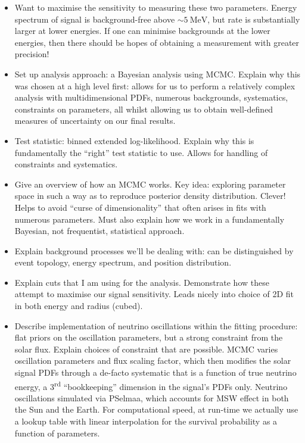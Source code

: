      \begin{itemize}
        \item Want to maximise the sensitivity to measuring these two parameters. Energy spectrum of signal is background-free above $\sim\SI{5}{\MeV}$, but rate is substantially larger at lower energies. If one can minimise backgrounds at the lower energies, then there should be hopes of obtaining a measurement with greater precision!
        \item Set up analysis approach: a Bayesian analysis using MCMC. Explain why this was chosen at a high level first: allows for us to perform a relatively complex analysis with multidimensional PDFs, numerous backgrounds, systematics, constraints on parameters, all whilst allowing us to obtain well-defined measures of uncertainty on our final results.
        \item Test statistic: binned extended log-likelihood. Explain why this is fundamentally the ``right''  test statistic to use. Allows for handling of constraints and systematics.
        \item Give an overview of how an MCMC works. Key idea: exploring parameter space in such a way as to reproduce posterior density distribution. Clever! Helps to avoid ``curse of dimensionality'' that often arises in fits with numerous parameters. Must also explain how we work in a fundamentally Bayesian, not frequentist, statistical approach.
        \item Explain background processes we'll be dealing with: can be distinguished by event topology, energy spectrum, and position distribution.
        \item Explain cuts that I am using for the analysis. Demonstrate how these attempt to maximise our signal sensitivity. Leads nicely into choice of 2D fit in both energy and radius (cubed).
        \item Describe implementation of neutrino oscillations within the fitting procedure: flat priors on the oscillation parameters, but a strong constraint from the solar flux. Explain choices of constraint that are possible. MCMC varies oscillation parameters and flux scaling factor, which then modifies the solar signal PDFs through a de-facto systematic that is a function of true neutrino energy, a 3\textsuperscript{rd} ``bookkeeping'' dimension in the signal's PDFs only. Neutrino oscillations simulated via PSelmaa, which accounts for MSW effect in both the Sun and the Earth. For computational speed, at run-time we actually use a lookup table with linear interpolation for the survival probability as a function of parameters.

\end{itemize}

